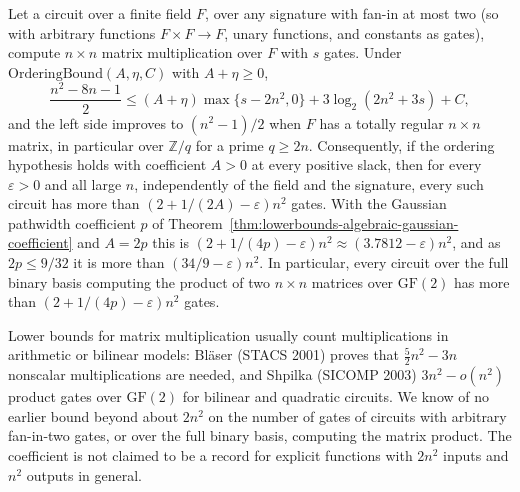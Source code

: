 \begin{theorem}
  \label{thm:lowerbounds-algebraic-mat-mul}
  \leanok
  Let a circuit over a finite field $F$, over any signature with fan-in at
  most two (so with arbitrary functions $F\times F\to F$, unary functions,
  and constants as gates), compute $n\times n$ matrix multiplication over
  $F$ with $s$ gates. Under $\mathrm{OrderingBound}(A,\eta,C)$ with
  $A+\eta\ge0$,
  \[
    \frac{n^2-8n-1}{2} \le (A+\eta)\max\{s-2n^2,0\} + 3\log_2(2n^2+3s) + C ,
  \]
  and the left side improves to $(n^2-1)/2$ when $F$ has a totally regular
  $n\times n$ matrix, in particular over $\mathbb{Z}/q$ for a prime
  $q\ge2n$. Consequently, if the ordering hypothesis holds with coefficient
  $A>0$ at every positive slack, then for every $\varepsilon>0$ and all
  large $n$, independently of the field and the signature, every such
  circuit has more than $(2+1/(2A)-\varepsilon)n^2$ gates. With the Gaussian
  pathwidth coefficient $p$ of
  Theorem~\ref{thm:lowerbounds-algebraic-gaussian-coefficient} and $A=2p$
  this is $(2+1/(4p)-\varepsilon)n^2\approx(3.7812-\varepsilon)n^2$, and as
  $2p\le9/32$ it is more than $(34/9-\varepsilon)n^2$. In particular, every
  circuit over the full binary basis computing the product of two
  $n\times n$ matrices over $\mathrm{GF}(2)$ has more than
  $(2+1/(4p)-\varepsilon)n^2$ gates.

  Lower bounds for matrix multiplication usually count multiplications in
  arithmetic or bilinear models: Bläser (STACS 2001) proves that
  $\tfrac52n^2-3n$ nonscalar multiplications are needed, and Shpilka
  (SICOMP 2003) $3n^2-o(n^2)$ product gates over $\mathrm{GF}(2)$ for
  bilinear and quadratic circuits. We know of no earlier bound beyond about
  $2n^2$ on the number of gates of circuits with arbitrary fan-in-two gates,
  or over the full binary basis, computing the matrix product. The
  coefficient is not claimed to be a record for explicit functions with
  $2n^2$ inputs and $n^2$ outputs in general.
\end{theorem}
